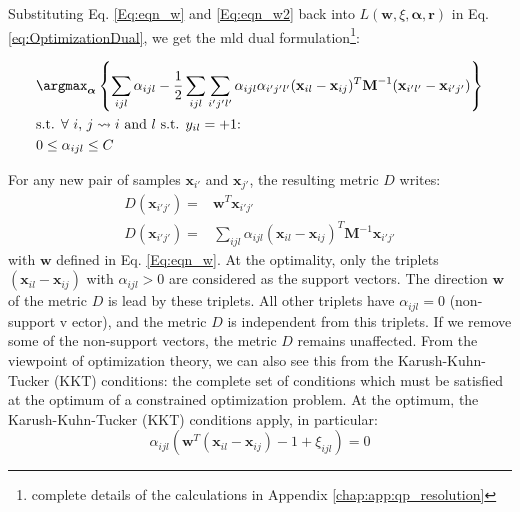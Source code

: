 \noindent Substituting Eq. \ref{Eq:eqn_w} and \ref{Eq:eqn_w2} back into $L(\textbf{w},\xi,\boldsymbol{\alpha},\textbf{r})$ in Eq. \ref{eq:OptimizationDual}, we get the {\sc mld} dual formulation\footnote{complete details of the calculations in Appendix \ref{chap:app:qp_resolution}}:

\begin{align}
&\displaystyle \argmax_{\boldsymbol{\alpha}} \left\lbrace 
\sum\limits_{ijl} \alpha_{ijl} 
- \frac{1}{2} \sum\limits_{ijl} \sum\limits_{i'j'l'}
\alpha_{ijl} \alpha_{i'j'l'}
(\textbf{x}_{il}-\textbf{x}_{ij})^T
\textbf{M}^{-1}
(\textbf{x}_{i'l'}-\textbf{x}_{i'j'}) \right\rbrace \label{eq:OptimDual} \\
&\text{s.t. $\forall$ $i$, $j \rightsquigarrow i$ and $l$ s.t. $y_{il}=+1$:} \nonumber \\
& 0 \leq \alpha_{ijl} \leq C
\label{eq:OptimDualconstraint}
\end{align}

\noindent For any new pair of samples $\textbf{x}_{i'}$ and $\textbf{x}_{j'}$, the resulting metric $D$ writes: 
\begin{align}
D(\textbf{x}_{i'j'}) = & \textbf{w}^T \textbf{x}_{i'j'} \label{eq:D1} \\
D(\textbf{x}_{i'j'}) = & \sum\limits_{ijl} \alpha_{ijl} 
(\textbf{x}_{il}-\textbf{x}_{ij})^T
\textbf{M}^{-1}
\textbf{x}_{i'j'}
\label{eq:D1_2}
\end{align}
with $\textbf{w}$ defined in Eq. \ref{Eq:eqn_w}. At the optimality, only the triplets $(\textbf{x}_{il}-\textbf{x}_{ij})$ with $\alpha_{ijl} > 0$ are considered as the support vectors. The direction $\textbf{w}$ of the metric $D$ is lead by these triplets. All other triplets have $\alpha_{ijl} = 0$ (non-support v ector), and the metric $D$ is independent from this triplets. If we remove some of the non-support vectors, the metric $D$ remains unaffected. From the viewpoint of optimization theory, we can also see this from the Karush-Kuhn-Tucker (KKT) conditions: the complete set of conditions which must be satisfied at the optimum of a constrained optimization problem. At the optimum, the Karush-Kuhn-Tucker (KKT) conditions apply, in particular:
\begin{equation*}
\alpha_{ijl} (\textbf{w}^T (\textbf{x}_{il}-\textbf{x}_{ij}) - 1 + \xi_{ijl}) = 0
\end{equation*}

